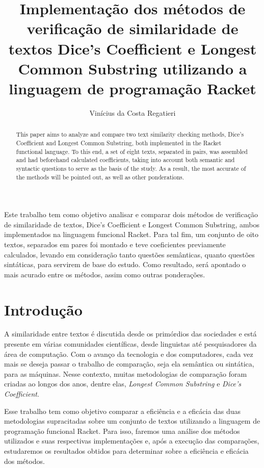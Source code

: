 \documentclass[12pt]{article}
\title{Implementação dos métodos de verificação de similaridade de textos Dice's Coefficient e Longest Common Substring utilizando a linguagem de programação Racket}
\author{Vinícius da Costa Regatieri\inst{1}}
\begin{document}
 

\maketitle

\begin{abstract}
This paper aims to analyze and compare two text similarity checking methods, Dice's Coefficient and Longest Common Substring, both implemented in the Racket functional language. To this end, a set of eight texts, separated in pairs, was assembled and had beforehand calculated coefficients, taking into account both semantic and syntactic questions to serve as the basis of the study. As a result, the most accurate of the methods will be pointed out, as well as other ponderations.
\end{abstract}
     
\begin{resumo} 
Este trabalho tem como objetivo analisar e comparar dois métodos de verificação de similaridade de textos, Dice's Coefficient e Longest Common Substring, ambos implementados na linguagem funcional Racket. Para tal fim, um conjunto de oito textos, separados em pares foi montado e teve coeficientes previamente calculados, levando em consideração tanto questões semânticas, quanto questões sintáticas, para servirem de base do estudo. Como resultado, será apontado o mais acurado entre os métodos, assim como outras ponderações.
\end{resumo}

\section{Introdução}
A similaridade entre textos é discutida desde os primórdios das sociedades e está presente em várias comunidades científicas, desde linguistas até pesquisadores da área de computação. Com o avanço da tecnologia e dos computadores, cada vez mais se deseja passar o trabalho de comparação, seja ela semântica ou sintática, para as máquinas. Nesse contexto, muitas metodologias de comparação foram criadas ao longos dos anos, dentre elas, \textit{Longest Common Substring} e \textit{Dice's Coefficient}.

Esse trabalho tem como objetivo comparar a eficiência e a eficácia das duas metodologias supracitadas sobre um conjunto de textos utilizando a linguagem de programação funcional Racket. Para isso, faremos uma análise dos métodos utilizados e suas respectivas implementações e, após a execução das comparações, estudaremos os resultados obtidos para determinar sobre a eficiência e eficácia dos métodos.
\end{document}
